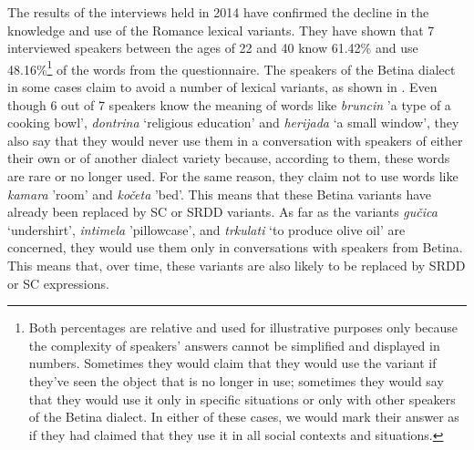 \documentclass[output=paper]{LSP/langsci}
\begin{document}
The results of the interviews held in 2014 have confirmed the decline in the knowledge and use of the Romance lexical variants. They have shown that 7 interviewed speakers between the ages of 22 and 40 know 61.42\% and use 48.16\%\footnote{Both percentages are relative and used for illustrative purposes only because the complexity of speakers’ answers cannot be simplified and displayed in numbers. Sometimes they would claim that they would use the variant if they’ve seen the object that is no longer in use; sometimes they would say that they would use it only in specific situations or only with other speakers of the Betina dialect. In either of these cases, we would mark their answer as if they had claimed that they use it in all social contexts and situations.} of the words from the questionnaire. The speakers of the Betina dialect in some cases claim to avoid a number of lexical variants, as shown in . Even though 6 out of 7 speakers know the meaning of words like \textit{bruncin} 'a type of a cooking bowl', \textit{dontrina} ‘religious education’ and \textit{herijada} ‘a small window’, they also say that they would never use them in a conversation with speakers of either their own or of another dialect variety because, according to them, these words are rare or no longer used. For the same reason, they claim not to use words like \textit{kamara }'room' and \textit{kočeta} 'bed'. This means that these Betina variants have already been replaced by SC or SRDD variants. As far as the variants \textit{gučica }‘undershirt’, \textit{intimela} 'pillowcase', and \textit{trkulati} ‘to produce olive oil’ are concerned, they would use them only in conversations with speakers from Betina. This means that, over time, these variants are also likely to be replaced by SRDD or SC expressions. 
\end{document}
